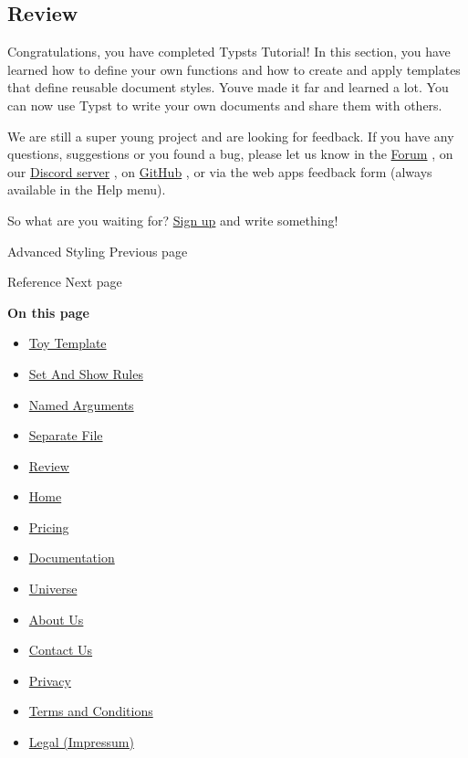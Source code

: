 \subsection{Review}\label{review}

Congratulations, you have completed Typst\textquotesingle s Tutorial! In
this section, you have learned how to define your own functions and how
to create and apply templates that define reusable document styles.
You\textquotesingle ve made it far and learned a lot. You can now use
Typst to write your own documents and share them with others.

We are still a super young project and are looking for feedback. If you
have any questions, suggestions or you found a bug, please let us know
in the \href{https://forum.typst.app/}{Forum} , on our
\href{https://discord.gg/2uDybryKPe}{Discord server} , on
\href{https://github.com/typst/typst/}{GitHub} , or via the web
app\textquotesingle s feedback form (always available in the Help menu).

So what are you waiting for? \href{https://typst.app}{Sign up} and write
something!

\href{/docs/tutorial/advanced-styling/}{\pandocbounded{}}

{ Advanced Styling } { Previous page }

\href{/docs/reference/}{\pandocbounded{}}

{ Reference } { Next page }

\textbf{On this page}

\begin{itemize}
\tightlist
\item
  \hyperref[toy-template]{Toy Template}
\item
  \hyperref[set-and-show-rules]{Set And Show Rules}
\item
  \hyperref[named-arguments]{Named Arguments}
\item
  \hyperref[separate-file]{Separate File}
\item
  \hyperref[review]{Review}
\end{itemize}

\begin{itemize}
\tightlist
\item
  \href{/}{Home}
\item
  \href{/pricing/}{Pricing}
\item
  \href{/docs/}{Documentation}
\item
  \href{/universe/}{Universe}
\item
  \href{/about/}{About Us}
\item
  \href{/contact/}{Contact Us}
\item
  \href{/privacy/}{Privacy}
\item
  \href{https://typst.app/terms}{Terms and Conditions}
\item
  \href{/legal/}{Legal (Impressum)}
\end{itemize}


